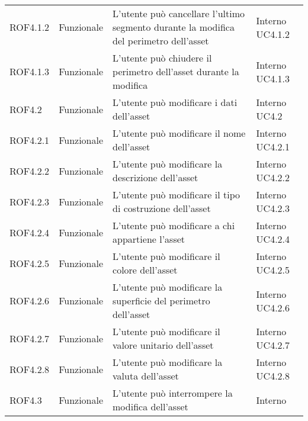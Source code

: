 \begin{longtable}{p{2cm}!{\VRule[1pt]}p{2cm}!{\VRule[1pt]}p{5cm}!{\VRule[1pt]}p{1.5cm}}
ROF4.1.2&Funzionale\newline  & L'utente può cancellare l'ultimo segmento durante la modifica del perimetro dell'asset & Interno \newline UC4.1.2
\\
ROF4.1.3&Funzionale\newline  & L'utente può chiudere il perimetro dell'asset durante la modifica & Interno \newline UC4.1.3
\\
ROF4.2&Funzionale\newline  & L'utente può modificare i dati dell'asset & Interno \newline UC4.2
\\
ROF4.2.1&Funzionale\newline  & L'utente può modificare il nome dell'asset & Interno \newline UC4.2.1
\\
ROF4.2.2&Funzionale\newline  & L'utente può modificare la descrizione dell'asset & Interno \newline UC4.2.2
\\
ROF4.2.3&Funzionale\newline  & L'utente può modificare il tipo di costruzione dell'asset & Interno \newline UC4.2.3
\\
ROF4.2.4&Funzionale\newline  & L'utente può modificare a chi appartiene l'asset & Interno \newline UC4.2.4
\\
ROF4.2.5&Funzionale\newline  & L'utente può modificare il colore dell'asset & Interno \newline UC4.2.5
\\
ROF4.2.6&Funzionale\newline  & L'utente può modificare la superficie del perimetro dell'asset & Interno \newline UC4.2.6
\\
ROF4.2.7&Funzionale\newline  & L'utente può modificare il  valore unitario dell'asset & Interno \newline UC4.2.7
\\
ROF4.2.8&Funzionale\newline  & L'utente può modificare la valuta dell'asset & Interno \newline UC4.2.8
\\
ROF4.3&Funzionale\newline  & L'utente può interrompere la modifica dell'asset & Interno \\

\end{longtable}
